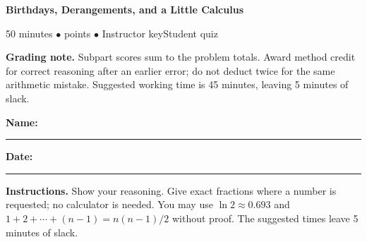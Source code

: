 \documentclass[11pt,letterpaper]{article}
\newcommand{\edition}{\ifanswers Instructor key\else Student quiz\fi}
\begin{document}
{\LARGE\bfseries\color{indigo}Birthdays, Derangements, and a Little Calculus}\par
{\small\color{muted}50 minutes \quad $\bullet$  points
  \quad $\bullet$ \quad \edition}\par
\ifanswers
  \textbf{Grading note.} Subpart scores sum to the problem totals. Award
  method credit for correct reasoning after an earlier error; do not deduct
  twice for the same arithmetic mistake. Suggested working time is 45 minutes,
  leaving 5 minutes of slack.\par
\else
  \smallskip
  \textbf{Name:}\ \rule{.49\linewidth}{.4pt}\hfill
  \textbf{Date:}\ \rule{.20\linewidth}{.4pt}\par
\fi
\textbf{Instructions.} Show your reasoning. Give exact fractions where a
number is requested; no calculator is needed. You may use
$\ln 2\approx0.693$ and $1+2+\cdots+(n-1)=n(n-1)/2$ without proof.
The suggested times leave 5 minutes of slack.
\end{document}
